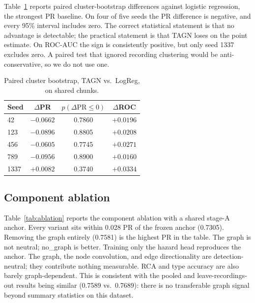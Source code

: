 \documentclass[conference]{IEEEtran}
\begin{document}
Table~\ref{tab:paired} reports paired cluster-bootstrap differences against logistic regression, the strongest PR baseline. On four of five seeds the PR difference is negative, and every 95\% interval includes zero. The correct statistical statement is that no advantage is detectable; the practical statement is that TAGN loses on the point estimate. On ROC-AUC the sign is consistently positive, but only seed 1337 excludes zero. A paired test that ignored recording clustering would be anti-conservative, so we do not use one.

\begin{table}[t]
\centering
\caption{Paired cluster bootstrap, TAGN vs.\ LogReg, on shared chunks.}
\label{tab:paired}
\footnotesize
\begin{tabular}{lccc}
\toprule
Seed & $\Delta$PR & $p(\Delta\mathrm{PR}\le 0)$ & $\Delta$ROC \\
\midrule
42 & $-0.0662$ & 0.7860 & $+0.0196$ \\
123 & $-0.0896$ & 0.8805 & $+0.0208$ \\
456 & $-0.0605$ & 0.7745 & $+0.0271$ \\
789 & $-0.0956$ & 0.8900 & $+0.0160$ \\
1337 & $+0.0082$ & 0.3740 & $+0.0334$ \\
\bottomrule
\end{tabular}
\end{table}

\subsection{Component ablation}

Table~\ref{tab:ablation} reports the component ablation with a shared stage-A anchor. Every variant sits within 0.028 PR of the frozen anchor (0.7305). Removing the graph entirely (0.7581) is the highest PR in the table. The graph is not neutral; no\_graph is better. Training only the hazard head reproduces the anchor. The graph, the node convolution, and edge directionality are detection-neutral; they contribute nothing measurable. RCA and type accuracy are also barely graph-dependent. This is consistent with the pooled and leave-recordings-out results being similar (0.7589 vs.\ 0.7689): there is no transferable graph signal beyond summary statistics on this dataset.
\end{document}
